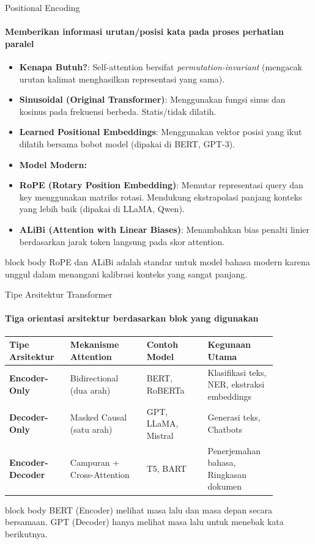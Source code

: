 \documentclass[aspectratio=169,t]{beamer}
\newcommand{\takeaway}[1]{%
  \vspace{0.1em}
  \begin{beamercolorbox}[rounded=true,shadow=false,sep=5pt]{block body}
    \centering\footnotesize\color{nvlightgreen}#1
  \end{beamercolorbox}%
}
\begin{document}
\begin{frame}{Positional Encoding}
  \framesubtitle{Memberikan informasi urutan/posisi kata pada proses perhatian paralel}
  \begin{itemize}\small
    \item \textbf{Kenapa Butuh?}: Self-attention bersifat \emph{permutation-invariant} (mengacak urutan kalimat menghasilkan representasi yang sama).
    \item \textbf{Sinusoidal (Original Transformer)}: Menggunakan fungsi sinus dan kosinus pada frekuensi berbeda. Statis/tidak dilatih.
    \item \textbf{Learned Positional Embeddings}: Menggunakan vektor posisi yang ikut dilatih bersama bobot model (dipakai di BERT, GPT-3).
    \item[] \textbf{\color{nvlightgreen}Model Modern:}
    \item \textbf{RoPE (Rotary Position Embedding)}: Memutar representasi query dan key menggunakan matriks rotasi. Mendukung ekstrapolasi panjang konteks yang lebih baik (dipakai di LLaMA, Qwen).
    \item \textbf{ALiBi (Attention with Linear Biases)}: Menambahkan bias penalti linier berdasarkan jarak token langsung pada skor attention.
  \end{itemize}
  \takeaway{RoPE dan ALiBi adalah standar untuk model bahasa modern karena unggul dalam menangani kalibrasi konteks yang sangat panjang.}
\end{frame}

\begin{frame}{Tipe Arsitektur Transformer}
  \framesubtitle{Tiga orientasi arsitektur berdasarkan blok yang digunakan}
  \begin{center}
  \renewcommand{\arraystretch}{1.25}{\footnotesize\setlength{\tabcolsep}{8pt}
  \begin{tabular}{@{}p{0.20\linewidth}p{0.25\linewidth}p{0.20\linewidth}p{0.22\linewidth}@{}}
    \toprule \rowcolor{nvcard!50}
    \textbf{Tipe Arsitektur} & \textbf{Mekanisme Attention} & \textbf{Contoh Model} & \textbf{Kegunaan Utama} \\ \midrule
    \textbf{Encoder-Only} & Bidirectional (dua arah) & BERT, RoBERTa & Klasifikasi teks, NER, ekstraksi embeddings \\
    \textbf{Decoder-Only} & Masked Causal (satu arah) & GPT, LLaMA, Mistral & Generasi teks, Chatbots \\
    \textbf{Encoder-Decoder} & Campuran + Cross-Attention & T5, BART & Penerjemahan bahasa, Ringkasan dokumen \\
    \bottomrule
  \end{tabular}}
  \end{center}
  \takeaway{BERT (Encoder) melihat masa lalu dan masa depan secara bersamaan. GPT (Decoder) hanya melihat masa lalu untuk menebak kata berikutnya.}
\end{frame}
\end{document}
